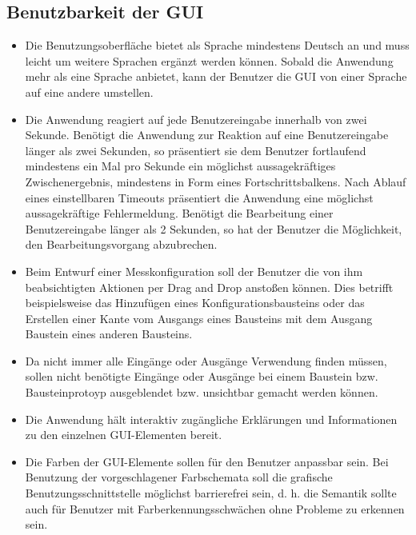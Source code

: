 \documentclass[parskip=full]{scrartcl}
\begin{document}
\subsection {Benutzbarkeit der GUI}
\begin{itemize}
	
	\item 
	\begin{WunschKrit} 		
		Die Benutzungsoberfläche bietet als Sprache mindestens Deutsch an und muss leicht um weitere Sprachen ergänzt werden können. Sobald die Anwendung mehr als eine Sprache anbietet, kann der Benutzer die GUI von einer Sprache auf eine andere umstellen.	
	\end{WunschKrit}
	\item 
	\begin{SollKrit}
		Die Anwendung reagiert auf jede Benutzereingabe innerhalb von zwei Sekunde. 
		Benötigt die Anwendung zur Reaktion auf eine Benutzereingabe länger als zwei Sekunden, so präsentiert sie dem Benutzer fortlaufend mindestens ein Mal pro Sekunde ein möglichst aussagekräftiges Zwischenergebnis, mindestens in Form eines Fortschrittsbalkens. 
		Nach Ablauf eines einstellbaren Timeouts präsentiert die Anwendung eine möglichst aussagekräftige Fehlermeldung. Benötigt die Bearbeitung einer Benutzereingabe länger als 2 Sekunden, so hat der Benutzer die Möglichkeit, den Bearbeitungsvorgang abzubrechen. 
	\end{SollKrit}
	\item 
	\begin{SollKrit} 
		Beim Entwurf einer Messkonfiguration soll der Benutzer die von ihm beabsichtigten Aktionen per Drag and Drop anstoßen können. Dies betrifft beispielsweise das Hinzufügen eines Konfigurationsbausteins oder das Erstellen einer Kante vom Ausgangs eines Bausteins mit dem Ausgang Baustein eines anderen Bausteins.
	\end{SollKrit}
	\item 
	\begin{WunschKrit}
		Da nicht immer alle Eingänge oder Ausgänge Verwendung finden müssen, sollen nicht benötigte Eingänge oder Ausgänge bei einem Baustein bzw. Bausteinprotoyp ausgeblendet bzw. unsichtbar gemacht werden können. 
	\end{WunschKrit}
	\item 
	\begin{SollKrit}
		Die Anwendung hält interaktiv zugängliche Erklärungen und Informationen zu den einzelnen GUI-Elementen bereit.
	\end{SollKrit}
	\item 
	\begin{WunschKrit} 
		Die Farben der GUI-Elemente sollen für den Benutzer anpassbar sein. Bei Benutzung der vorgeschlagener Farbschemata soll die grafische Benutzungsschnittstelle möglichst barrierefrei sein, d. h. die Semantik sollte auch für Benutzer mit Farberkennungsschwächen ohne Probleme zu erkennen sein.
	\end{WunschKrit} 
	

\end{itemize}
\end{document}

